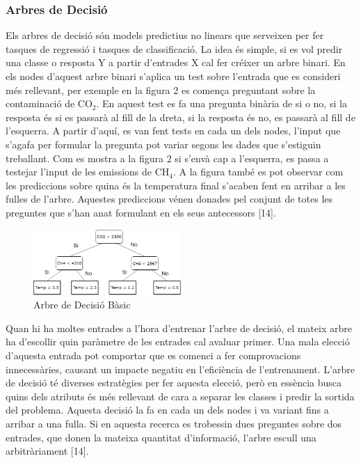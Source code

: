 \documentclass[10pt,a4paper,twocolumn,twoside]{article}
\begin{document}
\subsubsection{Arbres de Decisió} Els arbres de decisió són models predictius no linears que serveixen per fer tasques de regressió i tasques de classificació. La idea és simple, si es vol predir una classe o resposta Y a partir d'entrades X cal fer créixer un arbre binari. En els nodes d'aquest arbre binari s'aplica un test sobre l'entrada que es consideri més rellevant, per exemple en la figura 2 es comença preguntant sobre la contaminació de CO$_2$. En aquest test es fa una pregunta binària de si o no, si la resposta és si es passarà al fill de la dreta, si la resposta és no, es passarà al fill de l'esquerra. A partir d'aquí, es van fent tests en cada un dels nodes, l'input que s'agafa per formular la pregunta pot variar segons les dades que s'estiguin treballant. Com es mostra a la figura 2 si s'envà cap a l'esquerra, es passa a testejar l'input de les emissions de CH$_4$. A la figura també es pot observar com les prediccions sobre quina és la temperatura final s'acaben fent en arribar a les fulles de l'arbre. Aquestes prediccions vénen donades pel conjunt de totes les preguntes que s'han anat formulant en els seus antecessors [14].
\begin{figure}[!h]
\centering
	\includegraphics[width=0.5\textwidth]{../img/arbreDecisioSimple}
	\caption{Arbre de Decisió Bàsic}
	\label{fig-DecisionTree}
\end{figure}

Quan hi ha moltes entrades a l'hora d'entrenar l'arbre de decisió, el mateix arbre ha d'escollir quin paràmetre de les entrades cal avaluar primer. Una mala elecció d'aquesta entrada pot comportar que es comenci a fer comprovacions innecessàries, causant un impacte negatiu en l'eficiència de l'entrenament. L'arbre de decisió té diverses estratègies per fer aquesta elecció, però en essència busca quins dels atributs és més rellevant de cara a separar les classes i predir la sortida del problema. Aquesta decisió la fa en cada un dels nodes i va variant fins a arribar a una fulla. Si en aquesta recerca es trobessin dues preguntes sobre dos entrades, que donen la mateixa quantitat d'informació, l'arbre escull una arbitràriament [14].
\end{document}
